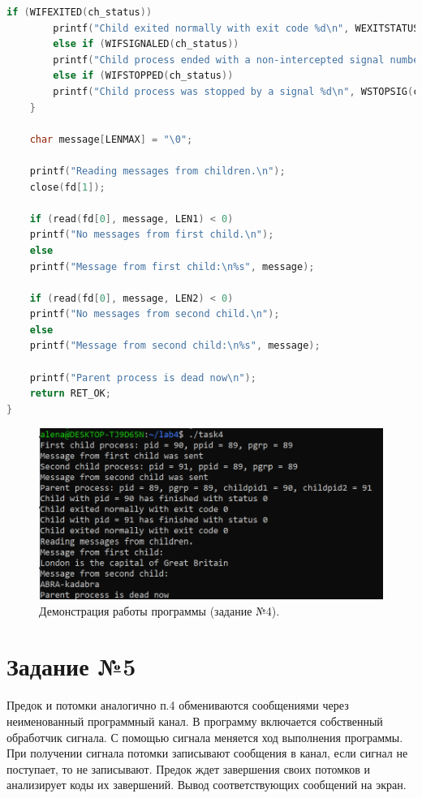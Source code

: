 \documentclass[12pt]{report}
\begin{document}
\begin{lstlisting}[label=some-code,caption=Код программы к заданию №4,language=C]
		if (WIFEXITED(ch_status))
		printf("Child exited normally with exit code %d\n", WEXITSTATUS(ch_status));
		else if (WIFSIGNALED(ch_status))
		printf("Child process ended with a non-intercepted signal number %d\n", WTERMSIG(ch_status));
		else if (WIFSTOPPED(ch_status))
		printf("Child process was stopped by a signal %d\n", WSTOPSIG(ch_status));
	}
	
	char message[LENMAX] = "\0";
	
	printf("Reading messages from children.\n");
	close(fd[1]);
	
	if (read(fd[0], message, LEN1) < 0)
	printf("No messages from first child.\n");
	else
	printf("Message from first child:\n%s", message);
	
	if (read(fd[0], message, LEN2) < 0)
	printf("No messages from second child.\n");
	else
	printf("Message from second child:\n%s", message);
	
	printf("Parent process is dead now\n");
	return RET_OK;
}
\end{lstlisting}

\begin{figure}[H]

	\centering

	\includegraphics[width=\linewidth]{img/task04.png}
	\caption{Демонстрация работы программы (задание №4).}

	\label{fig:task04}

\end{figure}

\section*{Задание №5}

Предок и потомки аналогично п.4 обмениваются сообщениями через неименованный программный канал. В программу включается собственный обработчик сигнала. С помощью сигнала меняется ход выполнения программы. При получении сигнала потомки записывают сообщения в канал, если сигнал не поступает, то не записывают. Предок ждет завершения своих потомков и анализирует коды их завершений. Вывод соответствующих сообщений на экран.
\end{document}
